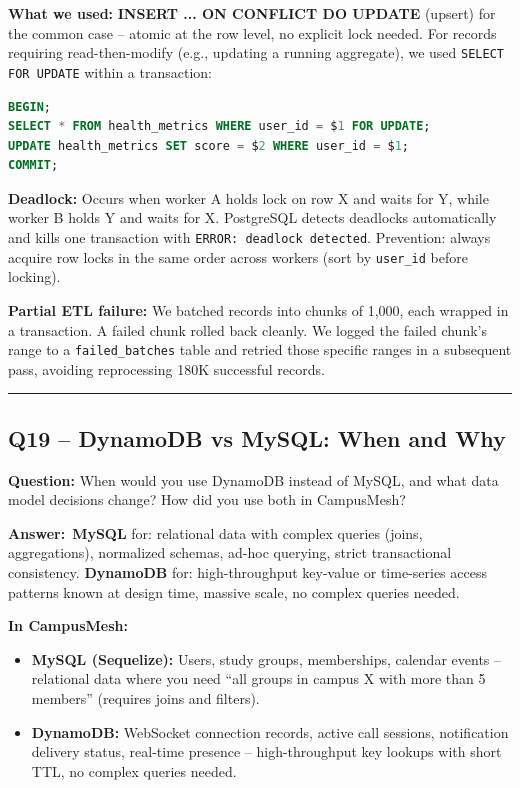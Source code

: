 \documentclass[letterpaper,10pt]{article}
\newlength{\boxwidth}
\newcommand{\questionbox}[1]{%
  \vspace{6pt}%
  \noindent\colorbox{qbg}{%
    \begin{minipage}{\boxwidth}%
      \vspace{3pt}\textbf{\textcolor{nordblue}{Question:}} #1\vspace{3pt}%
    \end{minipage}%
  }\vspace{2pt}%
}
\newcommand{\answerlabel}{\noindent\textbf{\textcolor{answerblue}{Answer:}}~}
\begin{document}
\textbf{What we used:} \textbf{INSERT ... ON CONFLICT DO UPDATE} (upsert) for the common case -- atomic at the row level, no explicit lock needed. For records requiring read-then-modify (e.g., updating a running aggregate), we used \texttt{SELECT FOR UPDATE} within a transaction:

\begin{lstlisting}[language=SQL]
BEGIN;
SELECT * FROM health_metrics WHERE user_id = $1 FOR UPDATE;
UPDATE health_metrics SET score = $2 WHERE user_id = $1;
COMMIT;
\end{lstlisting}

\textbf{Deadlock:} Occurs when worker A holds lock on row X and waits for Y, while worker B holds Y and waits for X. PostgreSQL detects deadlocks automatically and kills one transaction with \texttt{ERROR: deadlock detected}. Prevention: always acquire row locks in the same order across workers (sort by \texttt{user\_id} before locking).

\textbf{Partial ETL failure:} We batched records into chunks of 1,000, each wrapped in a transaction. A failed chunk rolled back cleanly. We logged the failed chunk's range to a \texttt{failed\_batches} table and retried those specific ranges in a subsequent pass, avoiding reprocessing 180K successful records.

\medskip\rule{\linewidth}{0.2pt}

\subsection*{Q19 -- DynamoDB vs MySQL: When and Why}

\questionbox{When would you use DynamoDB instead of MySQL, and what data model decisions change? How did you use both in CampusMesh?}

\answerlabel \textbf{MySQL} for: relational data with complex queries (joins, aggregations), normalized schemas, ad-hoc querying, strict transactional consistency. \textbf{DynamoDB} for: high-throughput key-value or time-series access patterns known at design time, massive scale, no complex queries needed.

\textbf{In CampusMesh:}
\begin{itemize}[leftmargin=*, itemsep=0pt]
  \item \textbf{MySQL (Sequelize):} Users, study groups, memberships, calendar events -- relational data where you need ``all groups in campus X with more than 5 members'' (requires joins and filters).
  \item \textbf{DynamoDB:} WebSocket connection records, active call sessions, notification delivery status, real-time presence -- high-throughput key lookups with short TTL, no complex queries needed.
\end{itemize}
\end{document}
